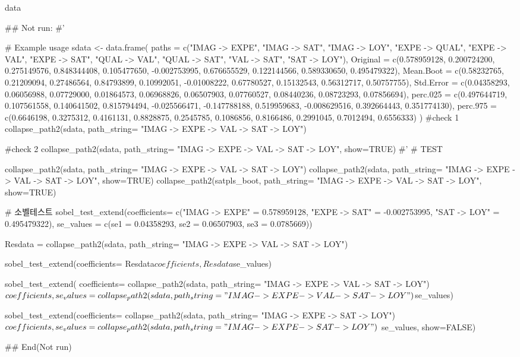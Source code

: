 \documentclass[a4paper]{book}
\begin{document}
%
\begin{Value}
data
\end{Value}
%
\begin{Examples}
\begin{ExampleCode}

## Not run: 
#'

# Example usage
sdata <- data.frame(
  paths = c("IMAG -> EXPE", "IMAG -> SAT", "IMAG -> LOY",
   "EXPE -> QUAL", "EXPE -> VAL", "EXPE -> SAT",
            "QUAL -> VAL", "QUAL -> SAT",
            "VAL -> SAT", "SAT -> LOY"),
  Original = c(0.578959128, 0.200724200, 0.275149576,
   0.848344408, 0.105477650, -0.002753995,
               0.676655529, 0.122144566, 0.589330650, 0.495479322),
  Mean.Boot = c(0.58232765, 0.21209094, 0.27486564,
  0.84793899, 0.10992051, -0.01008222,
                0.67780527, 0.15132543, 0.56312717, 0.50757755),
  Std.Error = c(0.04358293, 0.06056988, 0.07729000,
  0.01864573, 0.06968826, 0.06507903,
                0.07760527, 0.08440236, 0.08723293, 0.07856694),
  perc.025 = c(0.497644719, 0.107561558, 0.140641502,
   0.815794494, -0.025566471, -0.147788188,
               0.519959683, -0.008629516, 0.392664443, 0.351774130),
  perc.975 = c(0.6646198, 0.3275312, 0.4161131,
   0.8828875, 0.2545785, 0.1086856,
               0.8166486, 0.2991045, 0.7012494, 0.6556333)
)
#check 1
collapse_path2(sdata, path_string= "IMAG -> EXPE -> VAL -> SAT -> LOY")

#check 2
collapse_path2(sdata, path_string= "IMAG -> EXPE -> VAL -> SAT -> LOY", show=TRUE)
#'
# TEST

collapse_path2(sdata, path_string= "IMAG -> EXPE -> VAL -> SAT -> LOY")
collapse_path2(sdata, path_string= "IMAG -> EXPE -> VAL -> SAT -> LOY", show=TRUE)
collapse_path2(satpls_boot, path_string= "IMAG -> EXPE -> VAL -> SAT -> LOY", show=TRUE)

# 소벨테스트
sobel_test_extend(coefficients= c("IMAG -> EXPE" = 0.578959128,
                                  "EXPE -> SAT" = -0.002753995,
                                  "SAT -> LOY" = 0.495479322),
                  se_values = c(se1 = 0.04358293,
                                se2 = 0.06507903,
                                se3 = 0.0785669))


Resdata  =   collapse_path2(sdata, path_string= "IMAG -> EXPE -> VAL -> SAT -> LOY")

sobel_test_extend(coefficients= Resdata$coefficients, Resdata$se_values)


sobel_test_extend(
  coefficients= collapse_path2(sdata,
              path_string= "IMAG -> EXPE -> VAL -> SAT -> LOY")$coefficients,
  se_values =  collapse_path2(sdata,
        path_string= "IMAG -> EXPE -> VAL -> SAT -> LOY")$se_values)


sobel_test_extend(coefficients= collapse_path2(sdata,
         path_string=  "IMAG -> EXPE -> SAT -> LOY")$coefficients,
         se_values =  collapse_path2(sdata, path_string= "IMAG -> EXPE -> SAT -> LOY")$
                    se_values, show=FALSE)


## End(Not run)


\end{ExampleCode}
\end{Examples}
\end{document}
